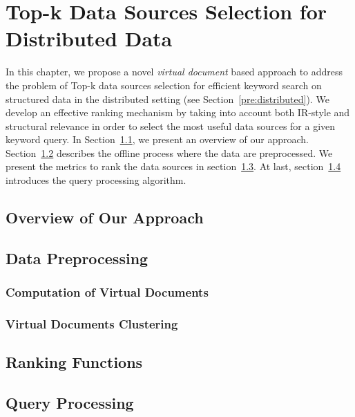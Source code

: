 \chapter{Top-k Data Sources Selection for Distributed Data}\label{dss}

In this chapter, we propose a novel \emph{virtual document} based approach to address the problem of
Top-k data sources selection for efficient keyword search on structured data in the distributed
setting (see Section~\ref{pre:distributed}). We develop an effective ranking mechanism by taking into
account both IR-style and structural relevance in order to select the most useful data sources for a
given keyword query. In Section~\ref{dss:overview}, we present an overview of our approach.
Section~\ref{dss:preprocessing} describes the offline process where the data are preprocessed. We
present the metrics to rank the data sources in section~\ref{dss:ranking}. At last,
section~\ref{dss:queryprocess} introduces the query processing algorithm.

\section{Overview of Our Approach}\label{dss:overview}



\section{Data Preprocessing}\label{dss:preprocessing}


\subsection{Computation of Virtual Documents}\label{dss:vdcompute}


\subsection{Virtual Documents Clustering}\label{dss:vdcluster}


\section{Ranking Functions}\label{dss:ranking}


\section{Query Processing}\label{dss:queryprocess}




